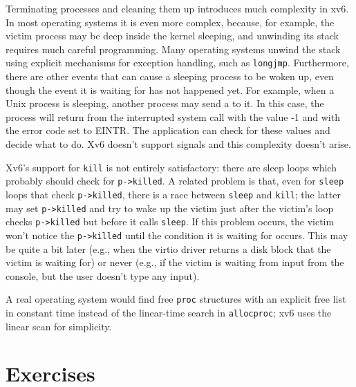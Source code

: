 Terminating processes and cleaning them up introduces much complexity in xv6.
In most operating systems it is even more complex, because, for example, the
victim process may be deep inside the kernel sleeping, and unwinding its
stack requires much careful programming.  Many operating systems unwind the stack
using explicit mechanisms for exception handling, such as
\lstinline{longjmp}.
Furthermore, there are other events that can cause a sleeping process to be
woken up, even though the event it is waiting for has not happened yet.  For
example, when a Unix process is sleeping, another process may send a 
to it.  In this case, the
process will return from the interrupted system call with the value -1 and with
the error code set to EINTR. The application can check for these values and
decide what to do.  Xv6 doesn't support signals and this complexity doesn't arise.

Xv6's support for
\lstinline{kill}
is not entirely satisfactory: there are sleep loops
which probably should check for
\lstinline{p->killed}.
A related problem is that, even for 
\lstinline{sleep}
loops that check
\lstinline{p->killed},
there is a race between 
\lstinline{sleep}
and
\lstinline{kill};
the latter may set
\lstinline{p->killed}
and try to wake up the victim just after the victim's loop
checks
\lstinline{p->killed}
but before it calls
\lstinline{sleep}.
If this problem occurs, the victim won't notice the
\lstinline{p->killed}
until the condition it is waiting for occurs. This may be quite a bit later
(e.g., when the virtio driver returns a disk block that the victim is waiting for) or never
(e.g., if the victim is waiting from input from the console, but the user
doesn't type any input).

A real operating system would find free
\lstinline{proc}
structures with an explicit free list
in constant time instead of the linear-time search in
\lstinline{allocproc};
xv6 uses the linear scan for simplicity.
\section{Exercises}

